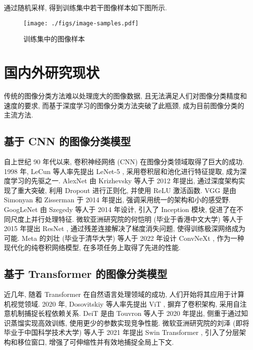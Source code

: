 \documentclass[12pt,a4paper]{article}
\begin{document}
通过随机采样, 得到训练集中若干图像样本如下图所示.

\begin{figure}[htbp]
    \centering
    \texttt{[image: ./figs/image-samples.pdf]}
    \caption{训练集中的图像样本}
\end{figure}

\section{国内外研究现状}

传统的图像分类方法难以处理庞大的图像数据, 且无法满足人们对图像分类精度和速度的要求, 而基于深度学习的图像分类方法突破了此瓶颈, 成为目前图像分类的主流方法.

\subsection{基于 CNN 的图像分类模型}

自上世纪 90 年代以来, 卷积神经网络 (CNN) 在图像分类领域取得了巨大的成功. 1998 年, LeCun 等人率先提出 LeNet-5 \cite{lecun_gradient-based_1998}, 采用卷积层和池化进行特征提取, 成为深度学习的先驱之一. AlexNet \cite{krizhevsky_imagenet_2012} 由 Krizhevsky 等人于 2012 年提出, 通过深度架构实现了重大突破, 利用 Dropout 进行正则化, 并使用 ReLU 激活函数. VGG \cite{simonyan_very_2015} 是由 Simonyan 和 Zisserman 于 2014 年提出, 强调采用统一的架构和小的感受野. GoogLeNet \cite{szegedy_going_2014} 由 Szegedy 等人于 2014 年设计, 引入了 Inception 模块, 促进了在不同尺度上并行处理特征. 微软亚洲研究院的何恺明 (毕业于香港中文大学) 等人于 2015 年提出 ResNet \cite{he_deep_2016}, 通过残差连接解决了梯度消失问题, 使得训练极深网络成为可能. Meta 的刘壮 (毕业于清华大学) 等人于 2022 年设计 ConvNeXt \cite{liu_convnet_2022}, 作为一种现代化的纯卷积网络模型, 在多项任务上取得了先进的性能.

\subsection{基于 Transformer 的图像分类模型}

近几年, 随着 Transformer \cite{vaswani_attention_2017} 在自然语言处理领域的成功, 人们开始将其应用于计算机视觉领域. 2020 年, Dosovitskiy 等人率先提出 ViT \cite{dosovitskiy_image_2021}, 摒弃了卷积架构, 采用自注意机制捕捉长程依赖关系. DeiT \cite{touvron_training_2021-1} 是由 Touvron 等人于 2020 年提出, 侧重于通过知识蒸馏实现高效训练, 使用更少的参数实现竞争性能. 微软亚洲研究院的刘泽 (即将毕业于中国科学技术大学) 等人于 2021 年提出 Swin Transformer \cite{liu_swin_2021}, 引入了分层架构和移位窗口, 增强了可伸缩性并有效地捕捉全局上下文.
\end{document}
